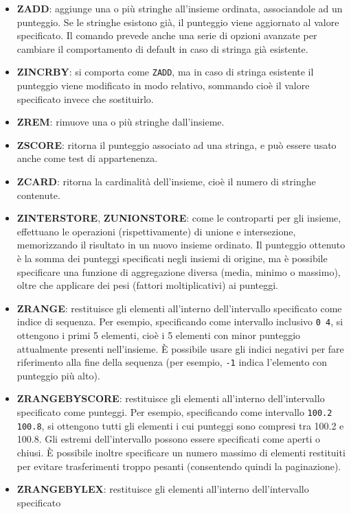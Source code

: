 \begin{itemize}
	\item \textbf{ZADD}: aggiunge una o più stringhe all'insieme ordinata, associandole ad un
	punteggio. Se le stringhe esistono già, il punteggio viene aggiornato al valore specificato. Il
	comando prevede anche una serie di opzioni avanzate per cambiare il comportamento di default in
	caso di stringa già esistente.
	\item \textbf{ZINCRBY}: si comporta come \verb|ZADD|, ma in caso di stringa esistente il
	punteggio viene modificato in modo relativo, sommando cioè il valore specificato invece che
	sostituirlo.
	\item \textbf{ZREM}: rimuove una o più stringhe dall'insieme.
	\item \textbf{ZSCORE}: ritorna il punteggio associato ad una stringa, e può essere usato anche
	come test di appartenenza.
	\item \textbf{ZCARD}: ritorna la cardinalità dell'insieme, cioè il numero di stringhe
	contenute.
	\item \textbf{ZINTERSTORE}, \textbf{ZUNIONSTORE}: come le controparti per gli insieme,
	effettuano le operazioni (rispettivamente) di unione e intersezione, memorizzando il risultato
	in un nuovo insieme ordinato. Il punteggio ottenuto è la somma dei punteggi specificati negli
	insiemi di origine, ma è possibile specificare una funzione di aggregazione diversa (media,
	minimo o massimo), oltre che applicare dei pesi (fattori moltiplicativi) ai punteggi.
	\item \textbf{ZRANGE}: restituisce gli elementi all'interno dell'intervallo specificato come
	indice di sequenza. Per esempio, specificando come intervallo inclusivo \verb|0 4|, si
	ottengono i primi 5 elementi, cioè i 5 elementi con minor punteggio attualmente presenti
	nell'insieme. È possibile usare gli indici negativi per fare riferimento alla fine della
	sequenza (per esempio, \verb|-1| indica l'elemento con punteggio più alto).
	\item \textbf{ZRANGEBYSCORE}: restituisce gli elementi all'interno dell'intervallo specificato
	come punteggi. Per esempio, specificando come intervallo \verb|100.2 100.8|, si ottengono tutti
	gli elementi i cui punteggi sono compresi tra 100.2 e 100.8. Gli estremi dell'intervallo
	possono essere specificati come aperti o chiusi. È possibile inoltre specificare un numero
	massimo di elementi restituiti per evitare trasferimenti troppo pesanti (consentendo quindi la
	paginazione).
	\item \textbf{ZRANGEBYLEX}: restituisce gli elementi all'interno dell'intervallo specificato

\end{itemize}
